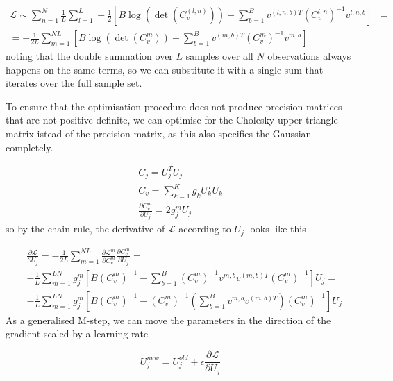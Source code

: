 \documentclass{paper}
\begin{document}
\begin{equation}
\begin{split}
\mathcal{L} \sim \sum_{n=1}^N \frac{1}{L} \sum_{l=1}^L -\frac{1}{2} \left[B \log \left( \det \left( C_v^{(l,n)} \right) \right) + \sum_{b=1}^B v^{(l,n,b)T}  \left( C_v^{l,n} \right)^{-1} v^{l,n,b}\right]& = \\
= -\frac{1}{2L} \sum_{m=1}^{NL} \left[B \log \left( \det \left( C_v^{m} \right) \right) + \sum_{b=1}^B v^{(m,b)T}  \left( C_v^{m} \right)^{-1} v^{m,b}\right]&
\end{split}
\end{equation}
%
noting that the double summation over $L$ samples over all $N$ observations always happens on the same terms, so we can substitute it with a single sum that iterates over the full sample set.

To ensure that the optimisation procedure does not produce precision matrices that are not positive definite, we can optimise for the Cholesky upper triangle matrix istead of the precision matrix, as this also specifies the Gaussian completely.

\begin{eqnarray}
C_j = U_j^T U_j \\
C_v = \sum_{k=1}^K g_k U_k^T U_k \\
\frac{\partial C_v^m}{\partial U_j} = 2 g_j^m U_j
\end{eqnarray}
%
so by the chain rule, the derivative of $\mathcal{L}$ according to $U_j$ looks like this

\begin{equation}
\begin{split}
&\frac{\partial \mathcal{L}}{\partial U_j} = -\frac{1}{2L} \sum_{m=1}^{NL} \frac{\partial \mathcal{L}^m}{\partial C_v^m} \frac{\partial C_v^m}{\partial U_j} = \\
& -\frac{1}{L} \sum_{m=1}^{LN} g_j^{m} \left[ B \left( C_v^m \right)^{-1} - \sum_{b=1}^B \left( C_v^m \right)^{-1} v^{m,b} v^{(m,b)T} \left( C_v^m \right)^{-1} \right] U_j = \\
& -\frac{1}{L} \sum_{m=1}^{LN} g_j^{m} \left[ B \left( C_v^m \right)^{-1} -  \left( C_v^m \right)^{-1} \left( \sum_{b=1}^B v^{m,b} v^{(m,b)T} \right) \left( C_v^m \right)^{-1} \right] U_j
\end{split}
\end{equation}
%
As a generalised M-step, we can move the parameters in the direction of the gradient scaled by a learning rate

\begin{equation}
U_j^{new} = U_j^{old} + \epsilon \frac{\partial \mathcal{L}}{\partial U_j}
\end{equation}
\end{document}
